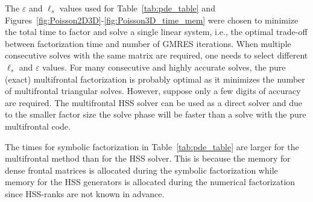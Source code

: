 \documentclass{article}
\begin{document}
The $\varepsilon$ and $\ell_s$ values used for
Table~\ref{tab:pde_table} and
Figures~\ref{fig:Poisson2D3D}-\ref{fig:Poisson3D_time_mem} were chosen
to minimize the total time to factor and solve a single linear system,
i.e., the optimal trade-off between factorization time and number of
GMRES iterations. When multiple consecutive solves with the same
matrix are required, one needs to select different $\ell_s$ and
$\varepsilon$ values. For many consecutive and highly accurate solves,
the pure (exact) multifrontal factorization is probably optimal as it
minimizes the number of multifrontal triangular solves. However,
suppose only a few digits of accuracy are required. The multifrontal
HSS solver can be used as a direct solver and due to the smaller
factor size the solve phase will be faster than a solve with the pure
multifrontal code.

The times for symbolic factorization in Table~\ref{tab:pde_table} are
larger for the multifrontal method than for the HSS solver. This is
because the memory for dense frontal matrices is allocated during the
symbolic factorization while memory for the HSS generators is
allocated during the numerical factorization since HSS-ranks are not
known in advance.
\end{document}
